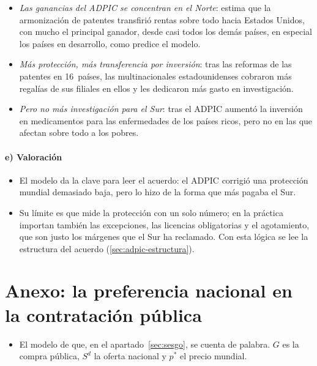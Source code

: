 \documentclass[11pt]{article}
\begin{document}
\begin{itemize}
\item \emph{Las ganancias del ADPIC se concentran en el Norte}: \textcite{McCalman2001Reaping} estima que la armonización de patentes transfirió rentas sobre todo hacia Estados Unidos, con mucho el principal ganador, desde casi todos los demás países, en especial los países en desarrollo, como predice el modelo.
\item \emph{Más protección, más transferencia por inversión}: tras las reformas de las patentes en 16~países, las multinacionales estadounidenses cobraron más regalías de sus filiales en ellos y les dedicaron más gasto en investigación\nocite{BranstetterFismanFoley2006Stronger}.
\item \emph{Pero no más investigación para el Sur}: tras el ADPIC aumentó la inversión en medicamentos para las enfermedades de los países ricos, pero no en las que afectan sobre todo a los pobres\nocite{KyleMcGahan2012Investments}.
\end{itemize}

\paragraph{e) Valoración}

\begin{itemize}
\item El modelo da la clave para leer el acuerdo: el ADPIC corrigió una protección mundial demasiado baja, pero lo hizo de la forma que más pagaba el Sur.
\item Su límite es que mide la protección con un solo número; en la práctica importan también las excepciones, las licencias obligatorias y el agotamiento, que son justo los márgenes que el Sur ha reclamado. Con esta lógica se lee la estructura del acuerdo (\ref{sec:adpic-estructura}).
\end{itemize}

\section{Anexo: la preferencia nacional\cortetitulo{} en la contratación pública}\label{anexo:sesgo}

\begin{itemize}
\item El modelo de \textcite{Baldwin1970Nontariff} que, en el apartado~\ref{sec:sesgo}, se cuenta de palabra. $G$ es la compra pública, $S^d$ la oferta nacional y $p^*$ el precio mundial.
\end{itemize}
\end{document}
